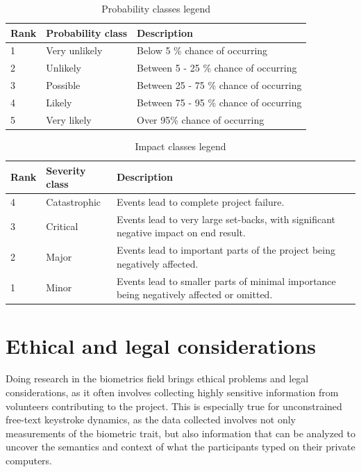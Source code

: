 \documentclass[informationsecurity]{gucmasterproject}
\begin{document}
\begin{table}[H]
\centering
\begin{tabular}{ p{2cm} p{3cm} p{8cm}}
\hline \bf Rank & \bf Probability class & \bf Description \\
\hline 1 & Very unlikely & Below 5 \% chance of occurring \\
2 & Unlikely & Between 5 - 25 \% chance of occurring \\
3 & Possible & Between 25 - 75 \% chance of occurring \\
4 & Likely & Between 75 - 95 \% chance of occurring \\
5 & Very likely & Over 95\% chance of occurring \\

\hline

\end{tabular}
\caption{Probability classes legend}
\label{tab:probability-classes}
\end{table}

\begin{table}[H]
\centering
\begin{tabular}{ p{2cm} p{3cm} p{8cm}}
\hline \bf Rank & \bf Severity class & \bf Description \\

\hline 4 & Catastrophic & Events lead to complete project failure. \\
3 & Critical & Events lead to very large set-backs, with significant negative impact on end result.\\
2 & Major & Events lead to important parts of the project being negatively affected. \\
1 & Minor & Events lead to smaller parts of minimal importance being negatively affected or omitted.\\
\hline
\end{tabular}
\caption{Impact classes legend}
\label{tab:impact-classes}
\end{table}





\chapter{Ethical and legal considerations}
Doing research in the biometrics field brings ethical problems and legal considerations, as it often involves collecting highly sensitive information from volunteers contributing to the project.
This is especially true for unconstrained free-text keystroke dynamics, as the data collected involves not only measurements of the biometric trait, but also information that can be analyzed to uncover the semantics and context of what the participants typed on their private computers. 
\end{document}

